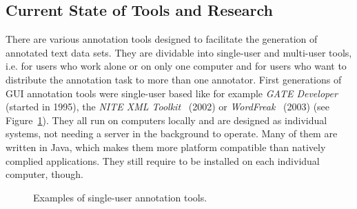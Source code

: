 \subsection{Current State of Tools and Research}
  \label{sec:currentState}
  There are various annotation tools designed to facilitate the generation of annotated text data sets. They are dividable into single-user and multi-user tools, i.e. for users who work alone or on only one computer and for users who want to distribute the annotation task to more than one annotator. First generations of \ac{GUI} annotation tools were single-user based like for example \textit{GATE Developer}~\cite{cunningham2011text} (started in 1995), the \textit{NITE XML Toolkit}~\cite{carletta2003nite} (2002) or \textit{WordFreak}~\cite{morton2003wordfreak} (2003) (see Figure~\ref{fig:annotationGateNiteFreak}). They all run on computers locally and are designed as individual systems, not needing a server in the background to operate. Many of them are written in Java, which makes them more platform compatible than natively complied applications. They still require to be installed on each individual computer, though.

  \begin{figure}[h]
    \centering
    \qquad
    \qquad
    \caption{Examples of single-user annotation tools.}%
    \label{fig:annotationGateNiteFreak}%
  \end{figure}

